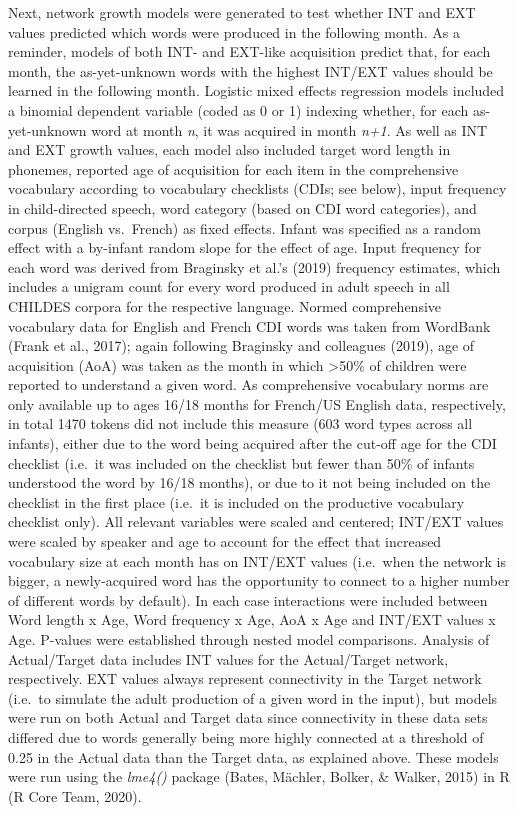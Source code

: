 \documentclass[
  man]{apa6}
\begin{document}
Next, network growth models were generated to test whether INT and EXT values predicted which words were produced in the following month. As a reminder, models of both INT- and EXT-like acquisition predict that, for each month, the as-yet-unknown words with the highest INT/EXT values should be learned in the following month.
Logistic mixed effects regression models included a binomial dependent variable (coded as 0 or 1) indexing whether, for each as-yet-unknown word at month \emph{n}, it was acquired in month \emph{n+1}. As well as INT and EXT growth values, each model also included target word length in phonemes, reported age of acquisition for each item in the comprehensive vocabulary according to vocabulary checklists (CDIs; see below), input frequency in child-directed speech, word category (based on CDI word categories), and corpus (English vs.~French) as fixed effects. Infant was specified as a random effect with a by-infant random slope for the effect of age. Input frequency for each word was derived from Braginsky et al.'s (2019) frequency estimates, which includes a unigram count for every word produced in adult speech in all CHILDES corpora for the respective language. Normed comprehensive vocabulary data for English and French CDI words was taken from WordBank (Frank et al., 2017); again following Braginsky and colleagues (2019), age of acquisition (AoA) was taken as the month in which \textgreater50\% of children were reported to understand a given word. As comprehensive vocabulary norms are only available up to ages 16/18 months for French/US English data, respectively, in total 1470 tokens did not include this measure (603 word types across all infants), either due to the word being acquired after the cut-off age for the CDI checklist (i.e.~it was included on the checklist but fewer than 50\% of infants understood the word by 16/18 months), or due to it not being included on the checklist in the first place (i.e.~it is included on the productive vocabulary checklist only). All relevant variables were scaled and centered; INT/EXT values were scaled by speaker and age to account for the effect that increased vocabulary size at each month has on INT/EXT values (i.e.~when the network is bigger, a newly-acquired word has the opportunity to connect to a higher number of different words by default). In each case interactions were included between Word length x Age, Word frequency x Age, AoA x Age and INT/EXT values x Age. P-values were established through nested model comparisons. Analysis of Actual/Target data includes INT values for the Actual/Target network, respectively. EXT values always represent connectivity in the Target network (i.e.~to simulate the adult production of a given word in the input), but models were run on both Actual and Target data since connectivity in these data sets differed due to words generally being more highly connected at a threshold of 0.25 in the Actual data than the Target data, as explained above. These models were run using the \emph{lme4()} package (Bates, Mächler, Bolker, \& Walker, 2015) in R (R Core Team, 2020).
\end{document}
